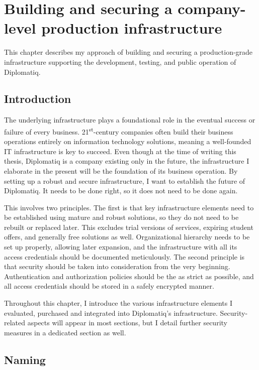 \chapter{Building and securing a company-level production infrastructure}
\label{chapter:infrastructure}

This chapter describes my approach of building and securing a production-grade infrastructure supporting the development, testing, and public operation of Diplomatiq.

\section{Introduction}

The underlying infrastructure plays a foundational role in the eventual success or failure of every business. 21\textsuperscript{st}-century companies often build their business operations entirely on information technology solutions, meaning a well-founded IT infrastructure is key to succeed. Even though at the time of writing this thesis, Diplomatiq is a company existing only in the future, the infrastructure I elaborate in the present will be the foundation of its business operation. By setting up a robust and secure infrastructure, I want to establish the future of Diplomatiq. It needs to be done right, so it does not need to be done again.

This involves two principles. The first is that key infrastructure elements need to be established using mature and robust solutions, so they do not need to be rebuilt or replaced later. This excludes trial versions of services, expiring student offers, and generally free solutions as well. Organizational hierarchy needs to be set up properly, allowing later expansion, and the infrastructure with all its access credentials should be documented meticulously. The second principle is that security should be taken into consideration from the very beginning. Authentication and authorization policies should be the as strict as possible, and all access credentials should be stored in a safely encrypted manner.

Throughout this chapter, I introduce the various infrastructure elements I evaluated, purchased and integrated into Diplomatiq's infrastructure. Security-related aspects will appear in most sections, but I detail further security measures in a dedicated section as well.

\section{Naming}

